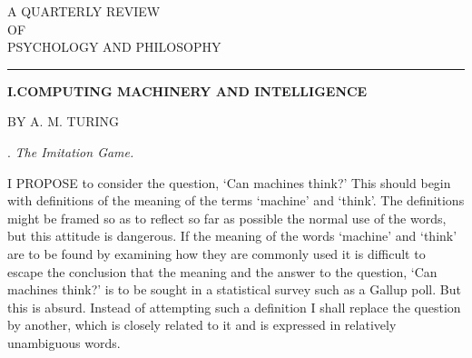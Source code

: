 \documentclass[10pt]{article} %
\newcommand{\articletitle}[1]{%
    \vspace*{0.7cm} %
    \begin{center}%
        {\normalfont\LARGE\textbf{#1}}%
    \end{center}%
    \par\vspace{0.2cm}%
}
\newcommand{\articleauthor}[1]{%
    \begin{center}%
        {\normalfont#1}%
    \end{center}%
    \par\vspace{0.5cm}%
}
\begin{document}
\thispagestyle{firstpage} %


\vspace*{1.2cm} %
\begin{center}
    {\Huge\textbf{}}
\end{center}

\vspace*{0.5cm} %
\begin{center}
    {\large A QUARTERLY REVIEW} \\
    \vspace{0.1cm} %
    {\normalsize OF} \\
    \vspace{0.1cm} %
    {\large PSYCHOLOGY AND PHILOSOPHY}
\end{center}

\vspace*{0.5cm} %
\begin{center}
    \rule{3cm}{0.75pt} %
\end{center}
\vspace*{0.7cm} %

\articletitle{I.\textemdash COMPUTING MACHINERY AND INTELLIGENCE} %
\articleauthor{\textsc{BY A. M. TURING}} %

\noindent{}. \textit{The Imitation Game.}
\vspace{0.5\baselineskip} %

I \textsc{PROPOSE} to consider the question, `Can machines think?' This should begin with definitions of the meaning of the terms `machine' and `think'. The definitions might be framed so as to reflect so far as possible the normal use of the words, but this attitude is dangerous. If the meaning of the words `machine' and `think' are to be found by examining how they are commonly used it is difficult to escape the conclusion that the meaning and the answer to the question, `Can machines think?' is to be sought in a statistical survey such as a Gallup poll. But this is absurd. Instead of attempting such a definition I shall replace the question by another, which is closely related to it and is expressed in relatively unambiguous words.
\end{document}
